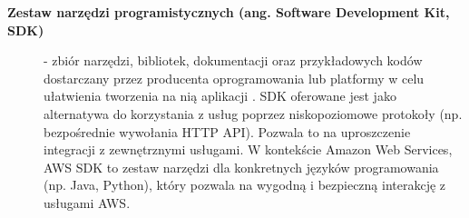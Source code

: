\begin{description}
    \item[\textbf{Zestaw narzędzi programistycznych (ang. Software Development Kit, SDK)}] - zbiór narzędzi, bibliotek, dokumentacji oraz przykładowych kodów dostarczany przez producenta oprogramowania lub platformy w celu ułatwienia tworzenia na nią aplikacji \cite{ibm_sdk_vs_api}. SDK oferowane jest jako alternatywa do korzystania z usług poprzez niskopoziomowe protokoły (np. bezpośrednie wywołania HTTP API). Pozwala to na uproszczenie integracji z zewnętrznymi usługami. W kontekście Amazon Web Services, AWS SDK to zestaw narzędzi dla konkretnych języków programowania (np. Java, Python), który pozwala na wygodną i bezpieczną interakcję z usługami AWS.
\end{description}
